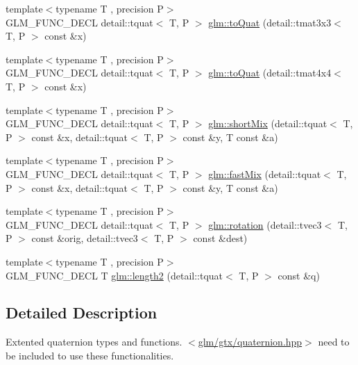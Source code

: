 \begin{DoxyCompactItemize}
{\footnotesize template$<$typename T , precision P$>$ }\\G\-L\-M\-\_\-\-F\-U\-N\-C\-\_\-\-D\-E\-C\-L detail\-::tquat$<$ T, P $>$ \hyperlink{group__gtx__quaternion_ga7647cfc0f26055a4eea4f99a35964d7b}{glm\-::to\-Quat} (detail\-::tmat3x3$<$ T, P $>$ const \&x)
\item 
{\footnotesize template$<$typename T , precision P$>$ }\\G\-L\-M\-\_\-\-F\-U\-N\-C\-\_\-\-D\-E\-C\-L detail\-::tquat$<$ T, P $>$ \hyperlink{group__gtx__quaternion_gab2e47ea15791ee85dfacfd9e952bad64}{glm\-::to\-Quat} (detail\-::tmat4x4$<$ T, P $>$ const \&x)
\item 
{\footnotesize template$<$typename T , precision P$>$ }\\G\-L\-M\-\_\-\-F\-U\-N\-C\-\_\-\-D\-E\-C\-L detail\-::tquat$<$ T, P $>$ \hyperlink{group__gtx__quaternion_ga297f92682708e59bda1849ca3aad0fea}{glm\-::short\-Mix} (detail\-::tquat$<$ T, P $>$ const \&x, detail\-::tquat$<$ T, P $>$ const \&y, T const \&a)
\item 
{\footnotesize template$<$typename T , precision P$>$ }\\G\-L\-M\-\_\-\-F\-U\-N\-C\-\_\-\-D\-E\-C\-L detail\-::tquat$<$ T, P $>$ \hyperlink{group__gtx__quaternion_ga5d1bb2670d0c73fff5912134ba7c024c}{glm\-::fast\-Mix} (detail\-::tquat$<$ T, P $>$ const \&x, detail\-::tquat$<$ T, P $>$ const \&y, T const \&a)
\item 
{\footnotesize template$<$typename T , precision P$>$ }\\G\-L\-M\-\_\-\-F\-U\-N\-C\-\_\-\-D\-E\-C\-L detail\-::tquat$<$ T, P $>$ \hyperlink{group__gtx__quaternion_ga964b26fdcd9f6f694c1003b0571092a6}{glm\-::rotation} (detail\-::tvec3$<$ T, P $>$ const \&orig, detail\-::tvec3$<$ T, P $>$ const \&dest)
\item 
{\footnotesize template$<$typename T , precision P$>$ }\\G\-L\-M\-\_\-\-F\-U\-N\-C\-\_\-\-D\-E\-C\-L T \hyperlink{group__gtx__quaternion_gaac8d704c7dfac92835109953b88f1c92}{glm\-::length2} (detail\-::tquat$<$ T, P $>$ const \&q)
\end{DoxyCompactItemize}


\subsection{Detailed Description}
Extented quaternion types and functions. $<$\hyperlink{gtx_2quaternion_8hpp}{glm/gtx/quaternion.\-hpp}$>$ need to be included to use these functionalities. 

